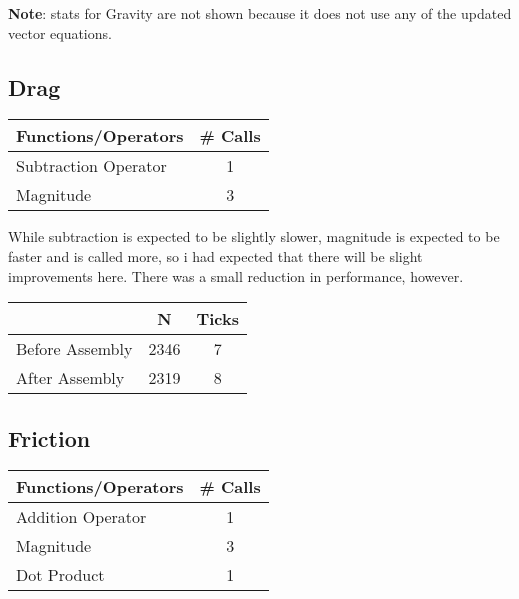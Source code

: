 \documentclass{article}
\begin{document}
\vspace{3mm}

\textbf{Note}: stats for Gravity are not shown because it does not use any of the updated vector equations.

\subsection{Drag}

\begin{table}[ht!]
\centering
\begin{tabular}{l|c}
Functions/Operators  &  \# Calls \\
\hline
Subtraction Operator &  1  \\
Magnitude            &  3  \\
\end{tabular}
\end{table}

While subtraction is expected to be slightly slower, magnitude is expected to be faster and is called more, so i had expected that there will be slight improvements here. There was a small reduction in performance, however.

\begin{table}[ht!]
\centering
\begin{tabular}{l|c|c}
                				   &   N   	    &  Ticks \\
\hline
Before Assembly 	&   2346  	&   7  \\
After Assembly   	 &   2319  	 &   8  \\
\end{tabular}
\end{table}

\vspace{5mm}

\subsection{Friction}

\begin{table}[ht!]
\centering
\begin{tabular}{l|c}
Functions/Operators  &  \# Calls \\
\hline
Addition Operator    &  1  \\
Magnitude            &  3  \\
Dot Product          &  1  \\
\end{tabular}
\end{table}
\end{document}
